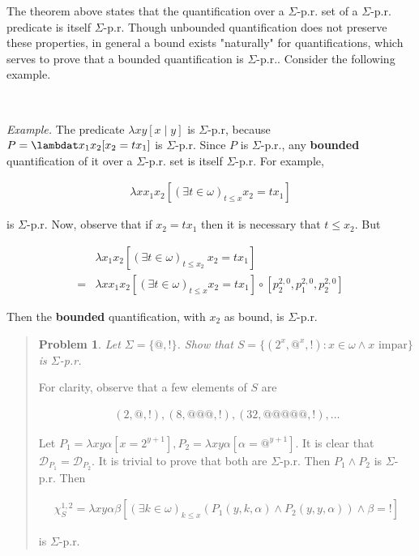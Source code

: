 \documentclass[a4paper, 12pt]{article}
\newtheorem{problem}{Problem}
\newtheorem{problem}{Problem}
\begin{document}
   
The theorem above states that the quantification over a $\Sigma$-p.r. set of a
$\Sigma$-p.r. predicate is itself $\Sigma$-p.r. Though unbounded quantification
does not preserve these properties, in general a bound exists "naturally" for
quantifications, which serves to prove that a bounded quantification is
$\Sigma$-p.r.. Consider the following example.

~

\textit{Example.} The predicate $\lambda xy[x \mid y]$ is $\Sigma$-p.r, because
$P = \lambdat x_1 x_2 [x_2 = tx_1]$ is $\Sigma$-p.r. Since $P$ is $\Sigma$-p.r.,
any \textbf{bounded} quantification of it over a $\Sigma$-p.r. set is itself
$\Sigma$-p.r. For example, 

\begin{align*}
    \lambda x x_1 x_2 \left[(\exists t \in \omega)_{t \leq x} x_2 = tx_1\right]
\end{align*}

is $\Sigma$-p.r. Now, observe that if $x_2 = tx_1$ then it is necessary that $t
\leq x_2$. But 

\begin{align*}
    &\lambda x_1 x_2 \left[(\exists t \in \omega)_{t \leq x_2} ~  x_2 =
tx_1\right] \\ = 
    &\lambda x x_1 x_2 \left[(\exists t \in \omega)_{t \leq x} x_2 = tx_1\right]
    \circ \left[ p_{2}^{2, 0}, p_1^{2, 0}, p_2^{2, 0} \right] 
\end{align*}

Then the \textbf{bounded} quantification, with $x_2$ as bound, is $\Sigma$-p.r.



\small
\begin{quote}


\begin{problem}
    Let $\Sigma = \{@, !\}$. Show that $S = \{(2^x, @^x, !) : x \in \omega \land x \text{ impar}\}$ is $\Sigma$-p.r.
\end{problem}

For clarity, observe that a few elements of
$S$ are 

\begin{align*}
    (2, @, !), (8, @@@, !), (32, @@@@@, !), \ldots
\end{align*}


Let $P_1 = \lambda xy\alpha \left[ x = 2^{y +1} \right], P_2 =
\lambda xy\alpha[\alpha = @^{y + 1}] $. It is clear that $\mathcal{D}_{P_1} =
\mathcal{D}_{P_2}$. It is trivial to prove that both are $\Sigma$-p.r. Then $P_1
\land P_2$ is $\Sigma$-p.r. Then

\begin{align*}
    \chi_{S}^{1, 2} = \lambda xy \alpha \beta \left[ (\exists k \in \omega)_{k \leq
        x} \left( P_1(y, k, \alpha) \land P_2(y, y, \alpha)\right) 
 \land \beta = !  \right] 
\end{align*}

is $\Sigma$-p.r.

\end{quote}
\normalsize
\end{document}

